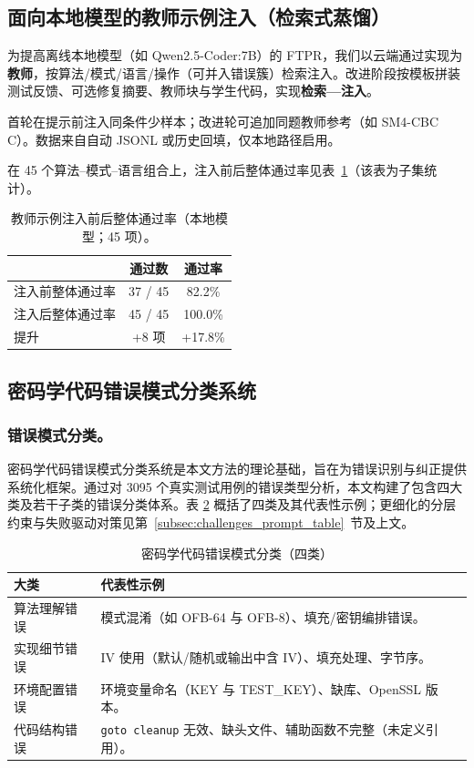 \documentclass[runningheads]{llncs}
\begin{document}
\subsection{面向本地模型的教师示例注入（检索式蒸馏）}
\label{subsec:distillation}
为提高离线本地模型（如 Qwen2.5-Coder:7B）的 FTPR，我们以云端通过实现为\textbf{教师}，按算法/模式/语言/操作（可并入错误簇）检索注入。改进阶段按模板拼装测试反馈、可选修复摘要、教师块与学生代码，实现\textbf{检索—注入}。

首轮在提示前注入同条件少样本；改进轮可追加同题教师参考（如 SM4-CBC C）。数据来自自动 JSONL 或历史回填，仅本地路径启用。

在 45 个算法–模式–语言组合上，注入前后整体通过率见表~\ref{tab:distillation_overall}（该表为子集统计）。
\begin{table}[H]
  \centering
  \footnotesize
  \caption{教师示例注入前后整体通过率（本地模型；45 项）。}
  \label{tab:distillation_overall}
  \begin{tabular}{l c c}
    \toprule
    & 通过数 & 通过率 \\
    \midrule
    注入前整体通过率 & 37 / 45 & 82.2\% \\
    注入后整体通过率 & 45 / 45 & 100.0\% \\
    提升             & +8 项   & +17.8\% \\
    \bottomrule
  \end{tabular}
\end{table}

\subsection{密码学代码错误模式分类系统}
\subsubsection{错误模式分类。}
密码学代码错误模式分类系统是本文方法的理论基础，旨在为错误识别与纠正提供系统化框架。通过对 3095 个真实测试用例的错误类型分析，本文构建了包含四大类及若干子类的错误分类体系。表 \ref{tab:error_classification} 概括了四类及其代表性示例；更细化的分层约束与失败驱动对策见第~\ref{subsec:challenges_prompt_table}~节及上文。
\begin{table}[htbp]
  \centering
  \footnotesize
  \caption{密码学代码错误模式分类（四类）}
  \label{tab:error_classification}
  \setlength{\tabcolsep}{6pt}
  \begin{tabular}{p{}p{}}
    \toprule
    大类 & 代表性示例 \\
    \midrule
    算法理解错误 & 模式混淆（如 OFB-64 与 OFB-8）、填充/密钥编排错误。 \\
    实现细节错误 & IV 使用（默认/随机或输出中含 IV）、填充处理、字节序。 \\
    环境配置错误 & 环境变量命名（KEY 与 TEST\_KEY）、缺库、OpenSSL 版本。 \\
    代码结构错误 & \texttt{goto cleanup} 无效、缺头文件、辅助函数不完整（未定义引用）。 \\
    \bottomrule
  \end{tabular}
\end{table}
\end{document}

